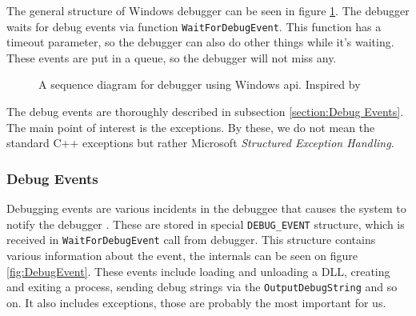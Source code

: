 The general structure of Windows debugger can be seen in figure \ref{fig:win32debugger}.
The debugger waits for debug events via function \texttt{WaitForDebugEvent}.
This function has a timeout parameter, so the debugger can also do other things while it's waiting.
These events are put in a queue, so the debugger will not miss any.

\begin{figure}
    \centering
    \caption{A sequence diagram for debugger using Windows api. Inspired by }
    \label{fig:win32debugger}
\end{figure}

The debug events are thoroughly described in subsection \ref{section:Debug Events}. The main point of interest is the exceptions.
By these, we do not mean the standard C++ exceptions but rather Microsoft \textit{Structured Exception Handling}.

\subsubsection*{Debug Events}\label{section:Debug Events}
Debugging events are various incidents in the debuggee that causes the system
to notify the debugger \cite{windows-msdn-debug-events}. These are stored in
special \texttt{DEBUG_EVENT} structure, which is received in
\texttt{WaitForDebugEvent} call from debugger. This structure contains various
information about the event, the internals can be seen on figure
\ref{fig:DebugEvent}. These events include loading and unloading a DLL,
creating and exiting a process, sending debug strings via the
\texttt{OutputDebugString} and so on. It also includes exceptions, those
are probably the most important for us. 

